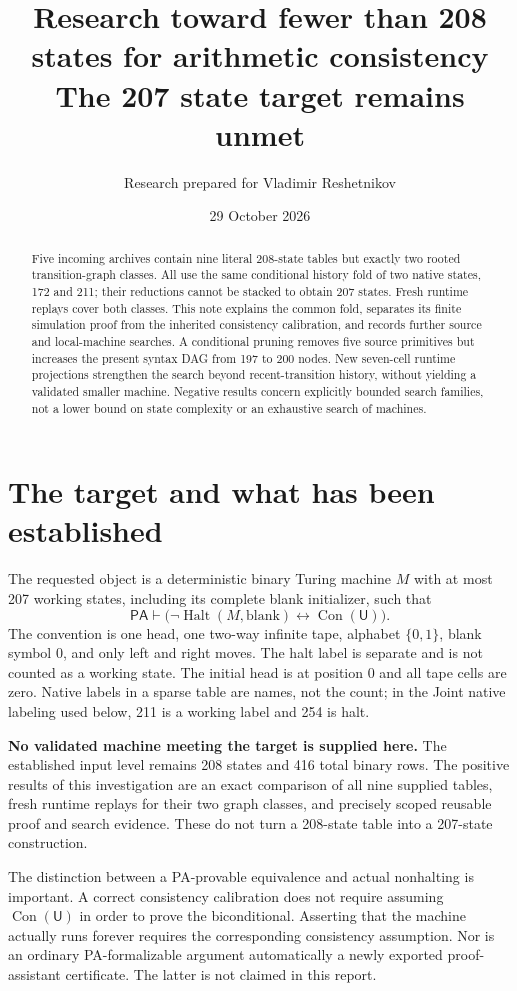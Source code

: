 \documentclass[11pt,letterpaper]{article}
\title{Research toward fewer than 208 states for arithmetic consistency\\[.4em]\large The 207 state target remains unmet}
\author{Research prepared for Vladimir Reshetnikov}\date{29 October 2026}
\newcommand{\PA}{\mathsf{PA}}\newcommand{\Con}{\operatorname{Con}}\newcommand{\Halt}{\operatorname{Halt}}\newcommand{\UU}{\mathsf U}
\begin{document}
\maketitle
\begin{abstract}
\StatusText\space
Five incoming archives contain nine literal 208-state tables but exactly two
rooted transition-graph classes. All use the same conditional history fold of
two native states, 172 and 211; their reductions cannot be stacked to obtain
207 states. Fresh runtime replays cover both classes. This note explains the
common fold, separates its finite simulation proof from the inherited
consistency calibration, and records further source and local-machine searches.
A conditional pruning removes five source primitives but increases the present
syntax DAG from 197 to 200 nodes. New seven-cell runtime projections strengthen
the search beyond recent-transition history, without yielding a validated
smaller machine. Negative results concern explicitly bounded search families,
not a lower bound on state complexity or an exhaustive search of machines.
\end{abstract}

\section{The target and what has been established}
The requested object is a deterministic binary Turing machine $M$ with at most
207 working states, including its complete blank initializer, such that
\[
 \PA\vdash\bigl(\neg\Halt(M,\mathrm{blank})\leftrightarrow\Con(\UU)\bigr).
\]
The convention is one head, one two-way infinite tape, alphabet $\{0,1\}$,
blank symbol 0, and only left and right moves. The halt label is separate and
is not counted as a working state. The initial head is at position 0 and all
tape cells are zero. Native labels in a sparse table are names, not the count;
in the Joint native labeling used below, 211 is a working label and 254 is halt.

\textbf{No validated machine meeting the target is supplied here.}
The established input level remains 208 states and 416 total binary rows.
The positive results of this investigation are an exact comparison of all
nine supplied tables, fresh runtime replays for their two graph classes,
and precisely scoped reusable proof and search evidence. These do not turn a
208-state table into a 207-state construction.

The distinction between a PA-provable equivalence and actual nonhalting is
important. A correct consistency calibration does not require assuming
$\Con(\UU)$ in order to prove the biconditional. Asserting that the machine
actually runs forever requires the corresponding consistency assumption.
Nor is an ordinary PA-formalizable argument automatically a newly exported
proof-assistant certificate. The latter is not claimed in this report.
\end{document}
